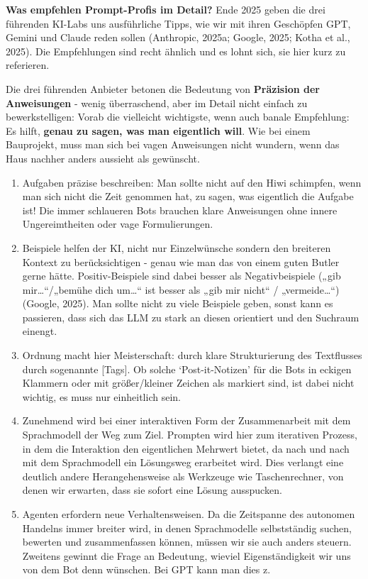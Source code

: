 \documentclass[
  ngerman,
  letterpaper,
  DIV=11]{scrreprt}
\begin{document}
\textbf{Was empfehlen Prompt-Profis im Detail?} Ende 2025 geben die drei
führenden KI-Labs uns ausführliche Tipps, wie wir mit ihren Geschöpfen
GPT, Gemini und Claude reden sollen (Anthropic, 2025a; Google, 2025;
Kotha et al., 2025). Die Empfehlungen sind recht ähnlich und es lohnt
sich, sie hier kurz zu referieren.

Die drei führenden Anbieter betonen die Bedeutung von \textbf{Präzision
der Anweisungen} - wenig überraschend, aber im Detail nicht einfach zu
bewerkstelligen: Vorab die vielleicht wichtigste, wenn auch banale
Empfehlung: Es hilft, \textbf{genau zu sagen, was man eigentlich will}.
Wie bei einem Bauprojekt, muss man sich bei vagen Anweisungen nicht
wundern, wenn das Haus nachher anders aussieht als gewünscht.

\begin{enumerate}
\def\labelenumi{(\arabic{enumi})}
\item
  Aufgaben präzise beschreiben: Man sollte nicht auf den Hiwi schimpfen,
  wenn man sich nicht die Zeit genommen hat, zu sagen, was eigentlich
  die Aufgabe ist! Die immer schlaueren Bots brauchen klare Anweisungen
  ohne innere Ungereimtheiten oder vage Formulierungen.
\item
  Beispiele helfen der KI, nicht nur Einzelwünsche sondern den breiteren
  Kontext zu berücksichtigen - genau wie man das von einem guten Butler
  gerne hätte. Positiv-Beispiele sind dabei besser als Negativbeispiele
  („gib mir\ldots``/„bemühe dich um\ldots`` ist besser als „gib mir
  nicht`` / „vermeide\ldots``) (Google, 2025). Man sollte nicht zu viele
  Beispiele geben, sonst kann es passieren, dass sich das LLM zu stark
  an diesen orientiert und den Suchraum einengt.
\item
  Ordnung macht hier Meisterschaft: durch klare Strukturierung des
  Textflusses durch sogenannte {[}Tags{]}. Ob solche `Post-it-Notizen'
  für die Bots in eckigen Klammern oder mit größer/kleiner Zeichen als
  markiert sind, ist dabei nicht wichtig, es muss nur einheitlich sein.
\item
  Zunehmend wird bei einer interaktiven Form der Zusammenarbeit mit dem
  Sprachmodell der Weg zum Ziel. Prompten wird hier zum iterativen
  Prozess, in dem die Interaktion den eigentlichen Mehrwert bietet, da
  nach und nach mit dem Sprachmodell ein Lösungsweg erarbeitet wird.
  Dies verlangt eine deutlich andere Herangehensweise als Werkzeuge wie
  Taschenrechner, von denen wir erwarten, dass sie sofort eine Lösung
  ausspucken.
\item
  Agenten erfordern neue Verhaltensweisen. Da die Zeitspanne des
  autonomen Handelns immer breiter wird, in denen Sprachmodelle
  selbstständig suchen, bewerten und zusammenfassen können, müssen wir
  sie auch anders steuern. Zweitens gewinnt die Frage an Bedeutung,
  wieviel Eigenständigkeit wir uns von dem Bot denn wünschen. Bei GPT
  kann man dies z.


\end{enumerate}
\end{document}

